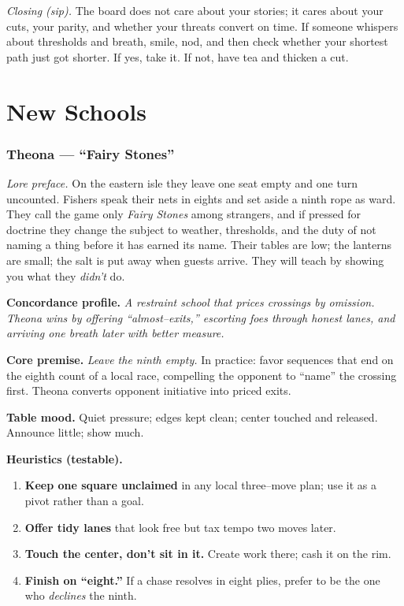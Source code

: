\documentclass[11pt]{article}
\numberwithin{equation}{section} %
\theoremstyle{plain} %
\theoremstyle{definition} %
\theoremstyle{remark} %
\begin{document}
\medskip
\noindent\textit{Closing (sip).} The board does not care about your stories; it cares about your cuts, your parity, and whether your threats convert on time. If someone whispers about thresholds and breath, smile, nod, and then check whether your shortest path just got shorter. If yes, take it. If not, have tea and thicken a cut.

\clearpage
\section{New Schools}
\label{app:schools}

\subsubsection{Theona — “Fairy Stones”}
\label{school:theona}
{}

\noindent\textit{Lore preface.} On the eastern isle they leave one seat empty and one turn uncounted. Fishers speak their nets in eights and set aside a ninth rope as ward. They call the game only \emph{Fairy Stones} among strangers, and if pressed for doctrine they change the subject to weather, thresholds, and the duty of not naming a thing before it has earned its name. Their tables are low; the lanterns are small; the salt is put away when guests arrive. They will teach by showing you what they \emph{didn’t} do.

\medskip
\noindent\textbf{Concordance profile.} \emph{A restraint school that prices crossings by omission. Theona wins by offering “almost–exits,” escorting foes through honest lanes, and arriving one breath later with better measure.}

\medskip
\noindent\textbf{Core premise.} \textit{Leave the ninth empty.} In practice: favor sequences that end on the eighth count of a local race, compelling the opponent to “name” the crossing first. Theona converts opponent initiative into priced exits.

\medskip
\noindent\textbf{Table mood.} Quiet pressure; edges kept clean; center touched and released. Announce little; show much.

\medskip
\noindent\textbf{Heuristics (testable).}
\begin{enumerate}\setlength\itemsep{0.25em}
  \item \textbf{Keep one square unclaimed} in any local three–move plan; use it as a pivot rather than a goal.
  \item \textbf{Offer tidy lanes} that look free but tax tempo two moves later.
  \item \textbf{Touch the center, don’t sit in it.} Create work there; cash it on the rim.
  \item \textbf{Finish on “eight.”} If a chase resolves in eight plies, prefer to be the one who \emph{declines} the ninth.
\end{enumerate}
\end{document}
